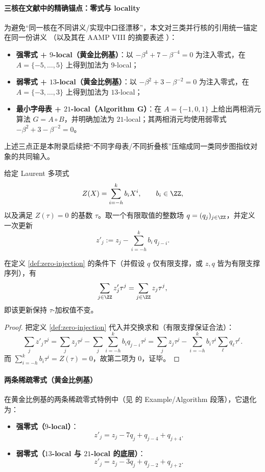 \paragraph{三核在文献中的精确锚点：零式与 locality}
为避免“同一核在不同讲义/实现中口径漂移”，本文对三类并行核的引用统一锚定在同一份讲义 \cite{FrougnyHellerPelantovaSvobodovaParallelAlgorithmsSlides}（以及其在 AAMP VIII 的摘要表述 \cite{SvobodovaAAMPVIIIParallelAddition}）：
\begin{itemize}
  \item \textbf{强零式 + $9$-local（黄金比例基）}：以 $-\beta^4+7-\beta^{-4}=0$ 为注入零式，在 $A=\{-5,\dots,5\}$ 上得到加法为 $9$-local；
  \item \textbf{弱零式 + $13$-local（黄金比例基）}：以 $-\beta^2+3-\beta^{-2}=0$ 为注入零式，在 $A=\{-3,\dots,3\}$ 上得到加法为 $13$-local；
  \item \textbf{最小字母表 + $21$-local（Algorithm G）}：在 $A=\{-1,0,1\}$ 上给出两相消元算法 $G=A\circ B$，并明确加法为 $21$-local；其两相消元均使用弱零式 $-\beta^2+3-\beta^{-2}=0$。
\end{itemize}
上述三点正是本附录后续把“不同字母表/不同折叠核”压缩成同一类同步图指纹对象的共同输入。

\begin{definition}\label{def:zero-injection}
给定 Laurent 多项式
$$
Z(X)=\sum_{i=-h}^{k}b_iX^i,\qquad b_i\in\ZZ,
$$
以及满足 $Z(\tau)=0$ 的基数 $\tau$。取一个有限取值的整数场 $q=(q_j)_{j\in\ZZ}$，并定义一次更新
$$
z'_j:=z_j-\sum_{i=-h}^{k}b_i\,q_{j-i}.
$$
\end{definition}

\begin{proposition}[值保持]\label{prop:zero-injection-value-preserving}
在定义 \ref{def:zero-injection} 的条件下（并假设 $q$ 仅有限支撑，或 $z,q$ 皆为有限支撑序列），有
\[
\sum_{j\in\ZZ} z'_j\tau^j=\sum_{j\in\ZZ} z_j\tau^j,
\]
即该更新保持 $\tau$-加权值不变。
\end{proposition}

\begin{proof}
把定义 \ref{def:zero-injection} 代入并交换求和（有限支撑保证合法）：
\[
\sum_j z'_j\tau^j=\sum_j z_j\tau^j-\sum_j\sum_{i=-h}^{k}b_i q_{j-i}\tau^j
=\sum_j z_j\tau^j-\sum_{i=-h}^{k}b_i\tau^i\sum_\ell q_{\ell}\tau^{\ell}.
\]
而 $\sum_{i=-h}^{k}b_i\tau^i=Z(\tau)=0$，故第二项为 $0$，证毕。
\end{proof}

\paragraph{两条稀疏零式（黄金比例基）}
在黄金比例基的两条稀疏零式特例中（见 \cite{FrougnyHellerPelantovaSvobodovaParallelAlgorithmsSlides} 的 Example/Algorithm 段落），它退化为：
\begin{itemize}
  \item \textbf{强零式（$9$-local）}：
  $$
  z'_j=z_j-7q_j+q_{j-4}+q_{j+4}.
  $$
  \item \textbf{弱零式（$13$-local 与 $21$-local 的底层）}：
  $$
  z'_j=z_j-3q_j+q_{j-2}+q_{j+2}.
  $$
\end{itemize}


